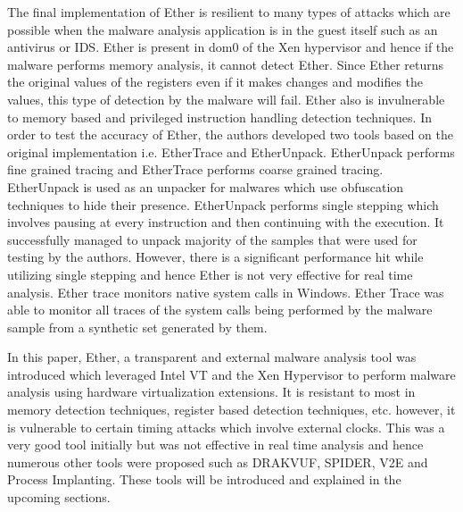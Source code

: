 \documentclass[11pt]{article}
\begin{document}
	The final implementation of Ether is resilient to many types of attacks which are possible when the malware analysis application is in the guest itself such as an antivirus or IDS. Ether is present in dom0 of the Xen hypervisor and hence if the malware performs memory analysis, it cannot detect Ether. Since Ether returns the original values of the registers even if it makes changes and modifies the values, this type of detection by the malware will fail. Ether also is invulnerable to memory based and privileged instruction handling detection techniques. In order to test the accuracy of Ether, the authors developed two tools based on the original implementation i.e. EtherTrace and EtherUnpack. EtherUnpack performs fine grained tracing and EtherTrace performs coarse grained tracing. EtherUnpack is used as an unpacker for malwares which use obfuscation techniques to hide their presence. EtherUnpack performs single stepping which involves pausing at every instruction and then continuing with the execution. It successfully managed to unpack majority of the samples that were used for testing by the authors. However, there is a significant performance hit while utilizing single stepping and hence Ether is not very effective for real time analysis. Ether trace monitors native system calls in Windows. Ether Trace was able to monitor all traces of the system calls being performed by the malware sample from a synthetic set generated by them. 
	
	In this paper, Ether, a transparent and external malware analysis tool was introduced which leveraged Intel VT and the Xen Hypervisor to perform malware analysis using hardware virtualization extensions. It is resistant to most in memory detection techniques, register based detection techniques, etc. however, it is vulnerable to certain timing attacks which involve external clocks. This was a very good tool initially but was not effective in real time analysis and hence numerous other tools were proposed such as DRAKVUF, SPIDER, V2E and Process Implanting. These tools will be introduced and explained in the upcoming sections.
	
\end{document}
